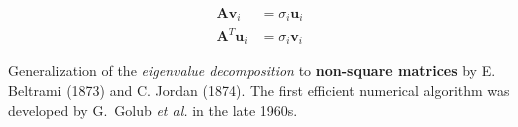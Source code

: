 \documentclass[aspectratio=169]{beamer}
\begin{document}
\begin{frame}
  \vfill

  
  \begin{tcolorbox}[
    enhanced,
    coltitle=black,
    coltext=white,
    colback=black,
    title=Singular value decomposition,
    frame style tile={width=\paperwidth}{background.jpg}
    ]
    
    \large
    \[
      \begin{aligned}
        \bm{Av}_i & = \sigma_i \bm{u}_i \\
        \bm{A}^T \bm{u}_i & = \sigma_i \bm{v}_i
      \end{aligned}
    \]
    
  \end{tcolorbox}

  \bigskip
  
  Generalization of the \emph{eigenvalue decomposition} to \textbf{non-square matrices} by E. Beltrami (1873) and C. Jordan (1874).
  The first efficient numerical algorithm was developed by G.\ Golub \emph{et al.} in the late 1960s.
  
  \vfill
\end{frame}
\end{document}
